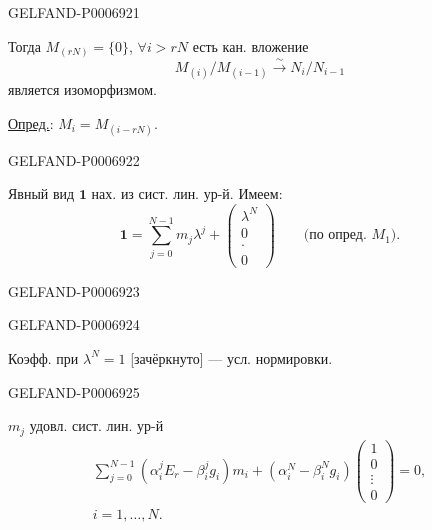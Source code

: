 \begin{GelfandAdjacentEvidence}{GELFAND-P000692}{1}

Тогда \(M_{(rN)}=\{0\}\), \(\forall i>rN\) есть кан. вложение
\[
M_{(i)}/M_{(i-1)}\overset{\sim}{\longrightarrow}N_i/N_{i-1}
\]
является изоморфизмом.

\underline{Опред.}: \(M_i=M_{(i-rN)}\).
\end{GelfandAdjacentEvidence}
\begin{GelfandAdjacentEvidence}{GELFAND-P000692}{2}


Явный вид \(\mathbf1\) нах. из сист. лин. ур-й. Имеем:
\[
\mathbf{1}=\sum_{j=0}^{N-1}m_j\lambda^j+
\begin{pmatrix}\lambda^N\\0\\\cdot\\0\end{pmatrix}
\qquad\text{(по опред. \(M_1\)).}
\]
\end{GelfandAdjacentEvidence}
\begin{GelfandAdjacentEvidence}{GELFAND-P000692}{3}

\end{GelfandAdjacentEvidence}
\begin{GelfandAdjacentEvidence}{GELFAND-P000692}{4}

Коэфф. при \(\lambda^N=1\) [зачёркнуто] --- усл. нормировки.
\end{GelfandAdjacentEvidence}
\begin{GelfandAdjacentEvidence}{GELFAND-P000692}{5}


\(m_j\) удовл. сист. лин. ур-й
\[
\begin{gathered}
\sum_{j=0}^{N-1}(\alpha_i^j E_r-\beta_i^j g_i)m_i+
(\alpha_i^N-\beta_i^N g_i)\begin{pmatrix}1\\0\\\vdots\\0\end{pmatrix}=0,\\
i=1,\ldots,N.
\end{gathered}
\]
\end{GelfandAdjacentEvidence}
